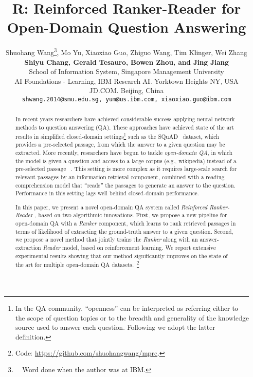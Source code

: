 \documentclass[letterpaper]{article} \usepackage{aaai18}  \usepackage{times}  \usepackage{helvet}  \usepackage{courier}  \usepackage{url}  \usepackage{graphicx}  \usepackage{comment}
\begin{document}
\title{R: Reinforced Ranker-Reader for Open-Domain Question Answering}

\author{ Shuohang Wang\thanks{~~Word done when the author was at IBM.}, Mo Yu, Xiaoxiao Guo, Zhiguo Wang, Tim Klinger, Wei Zhang\\
{ \bf \Large Shiyu Chang, Gerald Tesauro, Bowen Zhou, and Jing Jiang} \\
{School of Information System, Singapore Management University}\\
{AI Foundations - Learning, IBM Research AI. Yorktown Heights NY, USA}\\
{JD.COM. Beijing, China}\\
{\texttt {shwang.2014@smu.edu.sg,
 yum@us.ibm.com,
xiaoxiao.guo@ibm.com}}
}
 
\maketitle
\begin{abstract}
In recent years researchers have achieved considerable success applying neural network methods to question answering (QA).  These approaches have achieved state of the art results in simplified closed-domain settings\footnote{In the QA community, ``openness'' can be interpreted as referring either to the scope of question topics or to the breadth and generality of the knowledge source used to answer each question. Following \cite{chen2017reading} we adopt the latter definition.} such as the SQuAD~\cite{rajpurkar2016squad} dataset, which provides a pre-selected passage, from which the answer to a given question may be extracted.  More recently, researchers have begun to tackle {\it open-domain QA}, in which the model is given a question and access to a large corpus (e.g., wikipedia) instead of a pre-selected passage ~\cite{chen2017reading}.
This setting is more complex as it requires large-scale search for relevant passages by an information retrieval component, combined with a reading comprehension model that
``reads'' the passages to generate an answer to the question.
Performance in this 
setting 
lags well behind closed-domain performance.

In this paper, we present a novel open-domain QA system called {\it{Reinforced Ranker-Reader}} 
, based on two algorithmic innovations.  
First, we propose a new pipeline for open-domain QA with a \textit{Ranker} component, which learns to rank retrieved passages in terms of likelihood of extracting the ground-truth answer to a given question.
Second, we propose a novel method that jointly trains the \textit{Ranker} along with an answer-extraction \textit{Reader} model, based on reinforcement learning.
We report extensive experimental results showing that our method significantly improves on the state of the art for multiple open-domain QA datasets.~\footnote{Code:  \url{https://github.com/shuohangwang/mprc}. }
\end{abstract}
\end{document}
